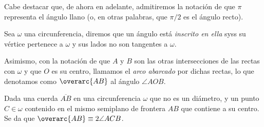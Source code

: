 \documentclass[11pt,a4paper]{book}
\begin{document}
Cabe destacar que, de ahora en adelante, admitiremos la notación de que $\pi$ representa el ángulo llano (o, en otras palabras, que $\pi/2$ es el ángulo recto).
\begin{mydef}
	Sea $\omega$ una circunferencia, diremos que un ángulo está \textit{inscrito en ella} syss su vértice pertenece a $\omega$ y sus lados no son tangentes a $\omega$.

	Asimismo, con la notación de que $A$ y $B$ son las otras intersecciones de las rectas con $\omega$ y que $O$ es su centro, llamamos el \textit{arco abarcado} por dichas rectas, lo que denotamos como $\overarc{AB}$ al ángulo $\angle AOB$.
\end{mydef}
\begin{thm}
	Dada una cuerda $\overline{AB}$ en una circunferencia $\omega$ que no es un diámetro, y un punto $C\in\omega$ contenido en el mismo semiplano de frontera $AB$ que contiene a su centro. Se da que $\overarc{AB}\equiv 2\angle ACB$.
\end{thm}
\end{document}
